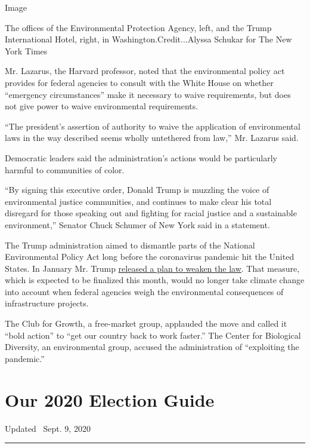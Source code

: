Image

The offices of the Environmental Protection Agency, left, and the Trump
International Hotel, right, in Washington.Credit...Alyssa Schukar for
The New York Times

Mr. Lazarus, the Harvard professor, noted that the environmental policy
act provides for federal agencies to consult with the White House on
whether ``emergency circumstances'' make it necessary to waive
requirements, but does not give power to waive environmental
requirements.

``The president's assertion of authority to waive the application of
environmental laws in the way described seems wholly untethered from
law,'' Mr. Lazarus said.

Democratic leaders said the administration's actions would be
particularly harmful to communities of color.

``By signing this executive order, Donald Trump is muzzling the voice of
environmental justice communities, and continues to make clear his total
disregard for those speaking out and fighting for racial justice and a
sustainable environment,'' Senator Chuck Schumer of New York said in a
statement.

The Trump administration aimed to dismantle parts of the National
Environmental Policy Act long before the coronavirus pandemic hit the
United States. In January Mr. Trump
\href{https://www.nytimes3xbfgragh.onion/2020/01/09/climate/trump-nepa-environment.html}{released
a plan to weaken the law}. That measure, which is expected to be
finalized this month, would no longer take climate change into account
when federal agencies weigh the environmental consequences of
infrastructure projects.

The Club for Growth, a free-market group, applauded the move and called
it ``bold action'' to ``get our country back to work faster.'' The
Center for Biological Diversity, an environmental group, accused the
administration of ``exploiting the pandemic.''

\hypertarget{our-2020-election-guide}{%
\section{Our 2020 Election Guide}\label{our-2020-election-guide}}

Updated ~Sept. 9, 2020

\begin{center}\rule{0.5\linewidth}{\linethickness}\end{center}

